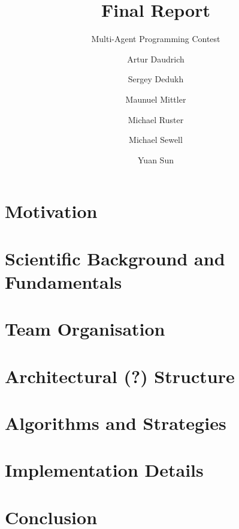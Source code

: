 \documentclass{../tech_reports/template/llncs}
\title{Final Report}
\subtitle{Multi-Agent Programming Contest}
\author{Artur Daudrich \and Sergey Dedukh \and Maunuel Mittler \and Michael Ruster \and Michael Sewell \and Yuan Sun}
\institute{University Koblenz-Landau}
\begin{document}
\maketitle

\section{Motivation}


\section{Scientific Background and Fundamentals}


\section{Team Organisation}


\section{Architectural (?) Structure}


\section{Algorithms and Strategies}


\section{Implementation Details}


\section{Conclusion}



\clearpage

\end{document}
